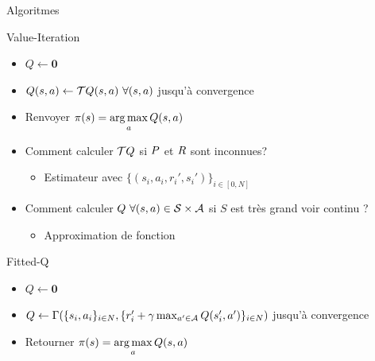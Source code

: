 \documentclass[french,handout]{beamer}
\begin{document}
    \begin{frame}{Algoritmes}

        \begin{block}{Value-Iteration}
            \begin{itemize}
                \item $Q \leftarrow \mathbf{0}$
                \item $Q(s,a) \leftarrow \mathcal{T} Q(s,a)\ \forall (s,a)$ jusqu'à convergence
                \item Renvoyer $\pi(s) = \operatorname*{arg\,max}\limits_{a} Q(s,a)$
            \end{itemize}
        \end{block}

        \begin{alertblock}{}
            \begin{itemize}
                \item Comment calculer $\mathcal{T} Q$ si $P$ et $R$ sont inconnues?
                \begin{itemize}
                    \item Estimateur avec $\{(s_i,a_i,r_i',s_i')\}_{i\in[0,N]}$
                \end{itemize}
                \item Comment calculer $Q\ \forall (s,a) \in \mathcal{S}\times\mathcal{A}$ si $S$ est très grand voir continu ?
                \begin{itemize}
                    \item Approximation de fonction
                \end{itemize}
            \end{itemize}

        \end{alertblock}

        \begin{block}{Fitted-Q}
            \begin{itemize}
                \item $Q \leftarrow \mathbf{0}$
                \item $Q \leftarrow \Gamma(\{s_{i},a_{i}\}_{{i}\in N},\{r'_{i} + \gamma  \max_{a'\in\mathcal{A}} Q(s'_i,a')\}_{{i} \in N})$ jusqu'à convergence
                \item Retourner $\pi(s) = \operatorname*{arg\,max}\limits_{a} Q(s,a)$
            \end{itemize}
        \end{block}


    \end{frame}
\end{document}
